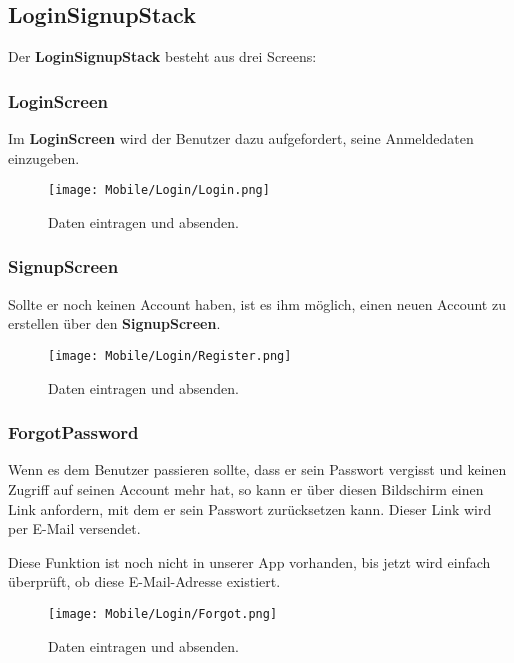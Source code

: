 \subsection{LoginSignupStack}
Der \textbf{LoginSignupStack} besteht aus drei Screens:

\subsubsection{LoginScreen}
Im \textbf{LoginScreen} wird der Benutzer dazu aufgefordert, seine Anmeldedaten einzugeben.

\begin{figure}[H]
  \begin{center}
    \texttt{[image: Mobile/Login/Login.png]}
    \caption{Daten eintragen und absenden.}
  \end{center}
\end{figure}

\subsubsection{SignupScreen}
Sollte er noch keinen Account haben, ist es ihm möglich, einen neuen Account zu erstellen über den
\textbf{SignupScreen}.

\begin{figure}[H]
  \begin{center}
    \texttt{[image: Mobile/Login/Register.png]}
    \caption{Daten eintragen und absenden.}
  \end{center}
\end{figure}

\subsubsection{ForgotPassword}
Wenn es dem Benutzer passieren sollte, dass er sein Passwort vergisst und keinen Zugriff auf seinen
Account mehr hat, so kann er über diesen Bildschirm einen Link anfordern, mit dem er sein Passwort
zurücksetzen kann. Dieser Link wird per E-Mail versendet.

Diese Funktion ist noch nicht in unserer App vorhanden, bis jetzt wird einfach überprüft, ob diese
E-Mail-Adresse existiert.

\begin{figure}[H]
  \begin{center}
    \texttt{[image: Mobile/Login/Forgot.png]}
    \caption{Daten eintragen und absenden.}
  \end{center}
\end{figure}

